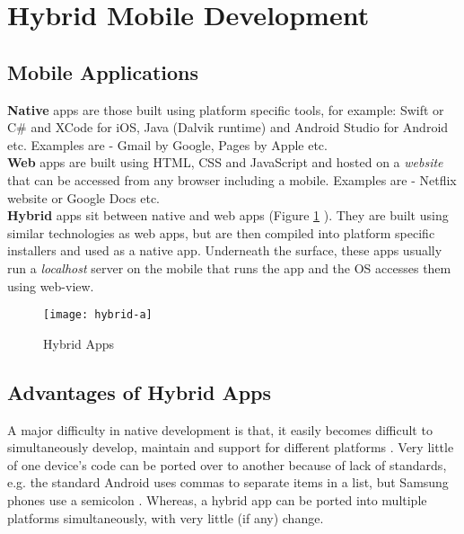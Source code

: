 
\section{Hybrid Mobile Development}

\subsection{Mobile Applications}

\textbf{Native} apps are those built using platform specific tools, for example: Swift or C\# and XCode for iOS, Java (Dalvik runtime) and Android Studio for Android etc. Examples are - Gmail by Google, Pages by Apple etc.\\

\textbf{Web} apps are built using HTML, CSS and JavaScript and hosted on a \textit{website} that can be accessed from any browser including a mobile. Examples are - Netflix website or Google Docs etc.\\

\textbf{Hybrid} apps sit between native and web apps (Figure \ref{Figure:Hybrid} \cite{salesforcehybrid-site}). They are built using similar technologies as web apps, but are then compiled into platform specific installers and used as a native app. Underneath the surface, these apps usually run a \textit{localhost} server on the mobile that runs the app and the OS accesses them using web-view. \cite{Litayem:2015, Karadimce:2014}

\begin{figure}[!h]
  \centering
    \texttt{[image: hybrid-a]}
  	\caption{Hybrid Apps}
  \label{Figure:Hybrid}
\end{figure}

\subsection{Advantages of Hybrid Apps}

A major difficulty in native development is that, it easily becomes difficult to simultaneously develop, maintain and support for different platforms \cite{Litayem:2015}. Very little of one device's code can be ported over to another because of lack of standards, e.g. the standard Android uses commas to separate items in a list, but Samsung phones use a semicolon \cite{Joorabchi:2013}. Whereas, a hybrid app can be ported into multiple platforms simultaneously, with very little (if any) change.\\

